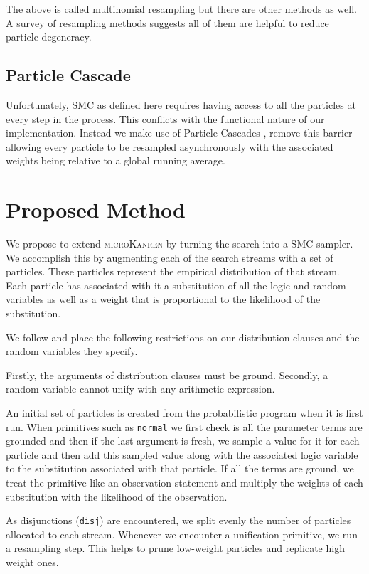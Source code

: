 \documentclass[
]{ceurart}
\begin{document}
The above is called multinomial resampling but there are other methods
as well. A survey\cite{douc2005comparison} of resampling methods
suggests all of them are helpful to reduce particle degeneracy.

\subsection{Particle Cascade}

Unfortunately, SMC as defined here requires having access to all the
particles at every step in the process. This conflicts with the
functional nature of our implementation. Instead we make use of
Particle Cascades \cite{PaigeWDT14}, remove this barrier allowing every
particle to be resampled asynchronously with the associated weights
being relative to a global running average. %

\section{Proposed Method}

We propose to extend \textsc{microKanren} by turning the search into a
SMC sampler. We accomplish this by augmenting each of the search
streams with a set of particles. These particles represent the
empirical distribution of that stream. Each particle has associated
with it a substitution of all the logic and random variables as well
as a weight that is proportional to the likelihood of the
substitution.

We follow \cite{gutmann2010extending} and place the following restrictions
on our distribution clauses and the random variables they specify.

Firstly, the arguments of distribution clauses must be
ground. Secondly, a random variable cannot unify with any arithmetic
expression.

An initial set of particles is created from the probabilistic program
when it is first run. When primitives such as \texttt{normal} we first
check is all the parameter terms are grounded and then if the last
argument is fresh, we sample a value for it for each particle and then
add this sampled value along with the associated logic variable to the
substitution associated with that particle. If all the terms are ground,
we treat the primitive like an observation statement and multiply the
weights of each substitution with the likelihood of the observation.

As disjunctions (\texttt{disj}) are encountered, we split evenly the
number of particles allocated to each stream. Whenever we encounter a
unification primitive, we run a resampling step. This helps to prune
low-weight particles and replicate high weight ones.
\end{document}
